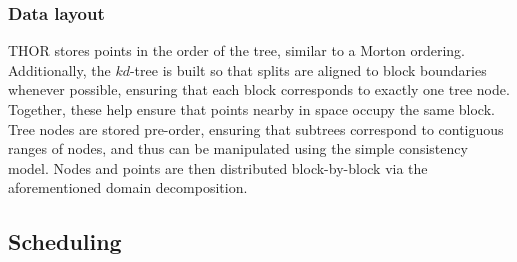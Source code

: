 \documentclass[twoside,leqno,twocolumn]{article}
\newcommand{\mysubsub}[1]{\subsubsection{#1} }
\begin{document}


\mysubsub{Data layout}
THOR stores points in the order of the tree, similar to a Morton ordering.
Additionally, the $kd$-tree is built so that splits are aligned to block boundaries whenever possible, ensuring that each block corresponds to exactly one tree node.
Together, these help ensure that points nearby in space occupy the same block.
Tree nodes are stored pre-order, ensuring that subtrees correspond to contiguous ranges of nodes, and thus can be manipulated using the simple consistency model.
Nodes and points are then distributed block-by-block via the aforementioned domain decomposition.

\subsection{Scheduling}
\end{document}
